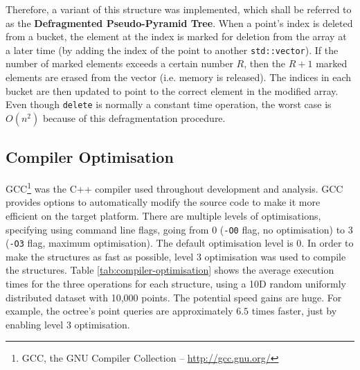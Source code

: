 Therefore, a variant of this structure was implemented, which shall be referred to as the \textbf{Defragmented Pseudo-Pyramid Tree}. When a point's index is deleted from a bucket, the element at the index is marked for deletion from the array at a later time (by adding the index of the point to another \texttt{std::vector}). If the number of marked elements exceeds a certain number $R$, then the $R + 1$ marked elements are erased from the vector (i.e. memory is released). The indices in each bucket are then updated to point to the correct element in the modified array. Even though \texttt{delete} is normally a constant time operation, the worst case is $O(n^2)$ because of this defragmentation procedure.

\subsection{Compiler Optimisation}

GCC\footnote{GCC, the GNU Compiler Collection -- \url{http://gcc.gnu.org/}} was the C++ compiler used throughout development and analysis. GCC provides options to automatically modify the source code to make it more efficient on the target platform. There are multiple levels of optimisations, specifying using command line flags, going from 0 (\texttt{-O0} flag, no optimisation) to 3 (\texttt{-O3} flag, maximum optimisation). The default optimisation level is 0. In order to make the structures as fast as possible, level 3 optimisation was used to compile the structures. Table \ref{tab:compiler-optimisation} shows the average execution times for the three operations for each structure, using a 10D random uniformly distributed dataset with 10,000 points. The potential speed gains are huge. For example, the octree's point queries are approximately $6.5$ times faster, just by enabling level 3 optimisation.

